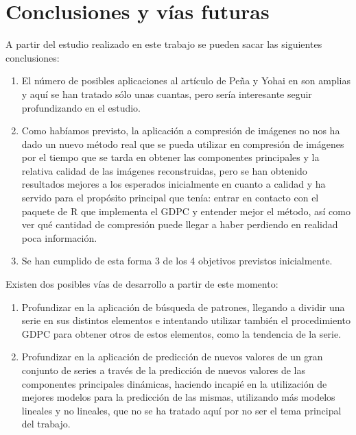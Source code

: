 \chapter{Conclusiones y vías futuras}
\label{ch:conclusiones}

A partir del estudio realizado en este trabajo se pueden sacar las siguientes conclusiones:
\begin{enumerate}
\item El número de posibles aplicaciones al artículo de Peña y Yohai en \cite{pena16} son amplias y aquí se han tratado sólo unas cuantas, pero sería interesante seguir profundizando en el estudio.
\item Como habíamos previsto, la aplicación a compresión de imágenes no nos ha dado un nuevo método real que se pueda utilizar en compresión de imágenes por el tiempo que se tarda en obtener las componentes principales y la relativa calidad de las imágenes reconstruidas, pero se han obtenido resultados mejores a los esperados inicialmente en cuanto a calidad y ha servido para el propósito principal que tenía: entrar en contacto con el paquete de R que implementa el GDPC y entender mejor el método, así como ver qué cantidad de compresión puede llegar a haber perdiendo en realidad poca información.
\item Se han cumplido de esta forma 3 de los 4 objetivos previstos inicialmente.
\end{enumerate}

Existen dos posibles vías de desarrollo a partir de este momento:
\begin{enumerate}
\item Profundizar en la aplicación de búsqueda de patrones, llegando a dividir una serie en sus distintos elementos e intentando utilizar también el procedimiento GDPC para obtener otros de estos elementos, como la tendencia de la serie.
\item Profundizar en la aplicación de predicción de nuevos valores de un gran conjunto de series a través de la predicción de nuevos valores de las componentes principales dinámicas, haciendo incapié en la utilización de mejores modelos para la predicción de las mismas, utilizando más modelos lineales y no lineales, que no se ha tratado aquí por no ser el tema principal del trabajo.
\end{enumerate}



